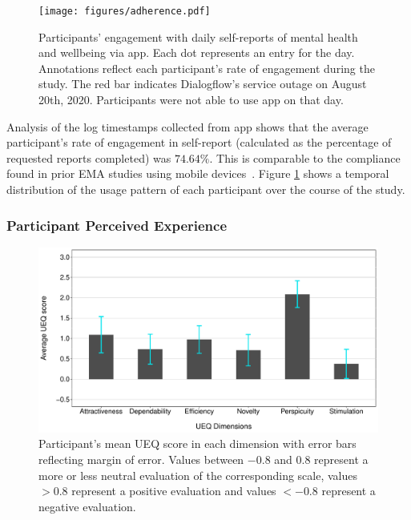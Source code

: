             \begin{figure}
                \centering
                \texttt{[image: figures/adherence.pdf]}
                \caption{Participants' engagement with daily self-reports of mental health and wellbeing via \acl{app}. Each dot represents an entry for the day. Annotations reflect each participant's rate of engagement during the study. The red bar indicates Dialogflow's service outage on August 20th, 2020. Participants were not able to use \acl{app} on that day.}
                \label{fig:adherence}
            \end{figure}
            
            Analysis of the log timestamps collected from \acl{app} shows that the average participant's rate of engagement in self-report (calculated as the percentage of requested reports completed) was $74.64\%$. This is comparable to the compliance found in prior \ac{EMA} studies using mobile devices~\cite{wen2017compliance}. Figure \ref{fig:adherence} shows a temporal distribution of the usage pattern of each participant over the course of the study. 

        \subsubsection{Participant Perceived Experience}\label{sec:perceived_experience}   
        
            \begin{figure}
                \centering
                \includegraphics[clip, trim=0cm 0cm 0.25cm 0.25cm, width=\textwidth]{figures/ueq.pdf}
                \caption{Participant's mean \ac{UEQ} score in each dimension with error bars reflecting margin of error. Values between $-0.8$ and $0.8$ represent a more or less neutral evaluation of the corresponding scale, values $> 0.8$ represent a positive evaluation and values $< -0.8$ represent a negative evaluation.}
                \label{fig:ueq}
            \end{figure}
            
